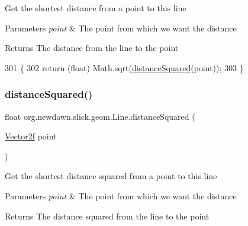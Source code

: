 Get the shortest distance from a point to this line


\begin{DoxyParams}{Parameters}
{\em point} & The point from which we want the distance \\
\hline
\end{DoxyParams}
\begin{DoxyReturn}{Returns}
The distance from the line to the point 
\end{DoxyReturn}

\begin{DoxyCode}
301                                           \{
302         \textcolor{keywordflow}{return} (\textcolor{keywordtype}{float}) Math.sqrt(\mbox{\hyperlink{classorg_1_1newdawn_1_1slick_1_1geom_1_1_line_a6d4d9753ee77f6303997690e0bbd115f}{distanceSquared}}(point));
303     \}
\end{DoxyCode}
\mbox{\label{classorg_1_1newdawn_1_1slick_1_1geom_1_1_line_a6d4d9753ee77f6303997690e0bbd115f}} 
\subsubsection{\texorpdfstring{distance\+Squared()}{distanceSquared()}}
{\footnotesize\ttfamily float org.\+newdawn.\+slick.\+geom.\+Line.\+distance\+Squared (\begin{DoxyParamCaption}\item[{\mbox{\hyperlink{classorg_1_1newdawn_1_1slick_1_1geom_1_1_vector2f}{Vector2f}}}]{point }\end{DoxyParamCaption})\hspace{0.3cm}{\ttfamily [inline]}}

Get the shortest distance squared from a point to this line


\begin{DoxyParams}{Parameters}
{\em point} & The point from which we want the distance \\
\hline
\end{DoxyParams}
\begin{DoxyReturn}{Returns}
The distance squared from the line to the point 
\end{DoxyReturn}

